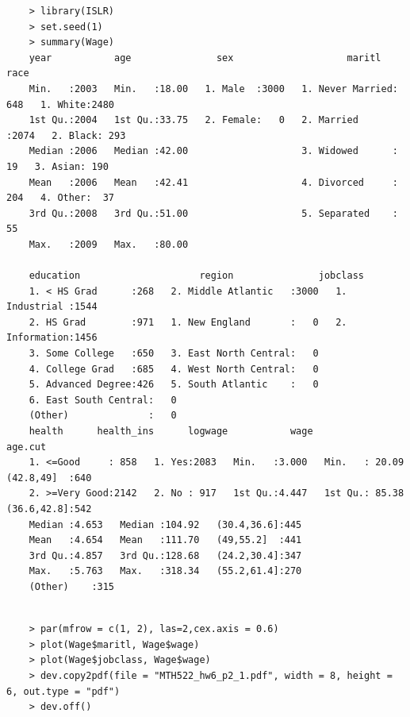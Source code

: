 \documentclass{article}
\begin{document}
\begin{program}
	\begin{verbatim}
	> library(ISLR)
	> set.seed(1)
	> summary(Wage)
	year           age               sex                    maritl           race     
	Min.   :2003   Min.   :18.00   1. Male  :3000   1. Never Married: 648   1. White:2480  
	1st Qu.:2004   1st Qu.:33.75   2. Female:   0   2. Married      :2074   2. Black: 293  
	Median :2006   Median :42.00                    3. Widowed      :  19   3. Asian: 190  
	Mean   :2006   Mean   :42.41                    4. Divorced     : 204   4. Other:  37  
	3rd Qu.:2008   3rd Qu.:51.00                    5. Separated    :  55                  
	Max.   :2009   Max.   :80.00                                                           
	
	education                     region               jobclass   
	1. < HS Grad      :268   2. Middle Atlantic   :3000   1. Industrial :1544  
	2. HS Grad        :971   1. New England       :   0   2. Information:1456  
	3. Some College   :650   3. East North Central:   0                        
	4. College Grad   :685   4. West North Central:   0                        
	5. Advanced Degree:426   5. South Atlantic    :   0                        
	6. East South Central:   0                        
	(Other)              :   0                        
	health      health_ins      logwage           wage               age.cut   
	1. <=Good     : 858   1. Yes:2083   Min.   :3.000   Min.   : 20.09   (42.8,49]  :640  
	2. >=Very Good:2142   2. No : 917   1st Qu.:4.447   1st Qu.: 85.38   (36.6,42.8]:542  
	Median :4.653   Median :104.92   (30.4,36.6]:445  
	Mean   :4.654   Mean   :111.70   (49,55.2]  :441  
	3rd Qu.:4.857   3rd Qu.:128.68   (24.2,30.4]:347  
	Max.   :5.763   Max.   :318.34   (55.2,61.4]:270  
	(Other)    :315  
	
	\end{verbatim}
\end{program}


\newpage


\begin{program}
	\begin{verbatim}
	> par(mfrow = c(1, 2), las=2,cex.axis = 0.6)
	> plot(Wage$maritl, Wage$wage)
	> plot(Wage$jobclass, Wage$wage)
	> dev.copy2pdf(file = "MTH522_hw6_p2_1.pdf", width = 8, height = 6, out.type = "pdf")
	> dev.off()
	\end{verbatim}
\end{program}
\end{document}
